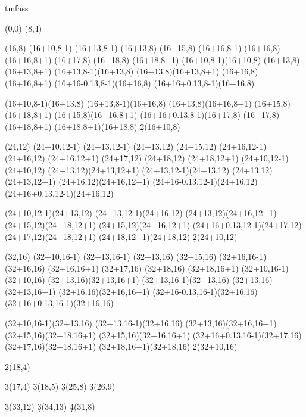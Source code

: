 \documentclass{article}
\begin{document}
\begin{sseqdata}[yscale=0.8, xscale=0.5]{tmfass}
\def\towergroupb(#1,#2){
    \towergroupa(#1,#2)
    \place1(#1+10,#2-1)
    \place1(#1+13,#2-1)    
    \place1(#1+13,#2)
    \place1(#1+15,#2)
    \place2(#1+16,#2-1)
    \place1(#1+16,#2)
    \place1(#1+16,#2+1)
    \place1(#1+17,#2)
    \place1(#1+18,#2)
    \place1(#1+18,#2+1)
    \structline(#1+10,#2-1)(#1+10,#2)
    \structline(#1+13,#2)(#1+13,#2+1)
    \structline(#1+13,#2-1)(#1+13,#2)
    \structline(#1+13,#2)(#1+13,#2+1)
    \structline(#1+16,#2)(#1+16,#2+1)
    \structline(#1+16-0.13,#2-1)(#1+16,#2)
    \structline(#1+16+0.13,#2-1)(#1+16,#2)    
    
    \structline(#1+10,#2-1)(#1+13,#2)
    \structline(#1+13,#2-1)(#1+16,#2)
    \structline(#1+13,#2)(#1+16,#2+1)
    \structline(#1+15,#2)(#1+18,#2+1)
    \structline(#1+15,#2)(#1+16,#2+1)
    \structline(#1+16+0.13,#2-1)(#1+17,#2)
    \structline(#1+17,#2)(#1+18,#2+1)
    \structline(#1+18,#2+1)(#1+18,#2)
    \d2(#1+10,#2)
    
}

\towergroup(0,0)
\towergroupa(8,4)
\towergroupb(16,8)
\towergroupb(24,12)
\towergroupb(32,16)

\d2(18,4)

\d3(17,4)
\d3(18,5)
\d3(25,8)
\d3(26,9)

\d3(33,12)
\d3(34,13)
\d4(31,8)
\end{sseqdata}

\newpage
{}
\newpage
{}
\end{document}
